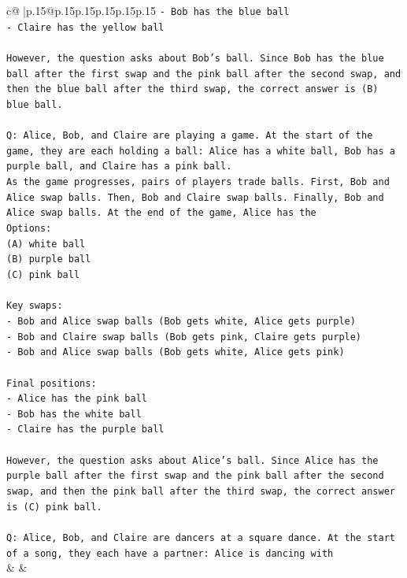 \documentclass{article}
\begin{document}
{\begin{supertabular}{c@{$\;$}|p{.15\linewidth}@{}p{.15\linewidth}p{.15\linewidth}p{.15\linewidth}p{.15\linewidth}p{.15\linewidth}}
{{{\texttt{{-} Bob has the blue ball} \\
\texttt{{-} Claire has the yellow ball} \\
\\ 
\texttt{However, the question asks about Bob's ball. Since Bob has the blue ball after the first swap and the pink ball after the second swap, and then the blue ball after the third swap, the correct answer is (B) blue ball.} \\
\\ 
\texttt{Q: Alice, Bob, and Claire are playing a game. At the start of the game, they are each holding a ball: Alice has a white ball, Bob has a purple ball, and Claire has a pink ball.} \\
\texttt{As the game progresses, pairs of players trade balls. First, Bob and Alice swap balls. Then, Bob and Claire swap balls. Finally, Bob and Alice swap balls. At the end of the game, Alice has the} \\
\texttt{Options:} \\
\texttt{(A) white ball} \\
\texttt{(B) purple ball} \\
\texttt{(C) pink ball} \\
\\ 
\texttt{Key swaps:} \\
\texttt{{-} Bob and Alice swap balls (Bob gets white, Alice gets purple)} \\
\texttt{{-} Bob and Claire swap balls (Bob gets pink, Claire gets purple)} \\
\texttt{{-} Bob and Alice swap balls (Bob gets white, Alice gets pink)} \\
\\ 
\texttt{Final positions:} \\
\texttt{{-} Alice has the pink ball} \\
\texttt{{-} Bob has the white ball} \\
\texttt{{-} Claire has the purple ball} \\
\\ 
\texttt{However, the question asks about Alice's ball. Since Alice has the purple ball after the first swap and the pink ball after the second swap, and then the pink ball after the third swap, the correct answer is (C) pink ball.} \\
\\ 
\texttt{Q: Alice, Bob, and Claire are dancers at a square dance. At the start of a song, they each have a partner: Alice is dancing with} \\
            }
        }
    }
    & & \\ \\


\end{supertabular}}
\end{document}
